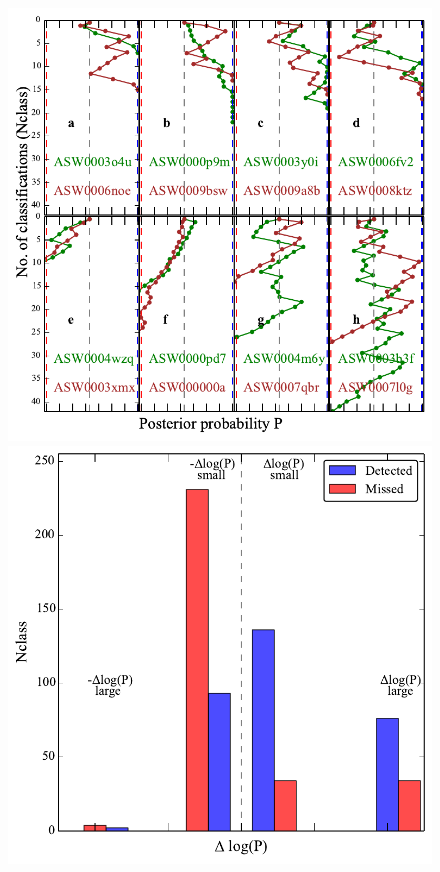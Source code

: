 \documentclass[useAMS,usenatbib,a4paper]{mn2e}
\begin{document}
\begin{figure}
\begin{center}
\includegraphics[scale=0.6]{sw-cfhtls-figs/det_mis_traj.pdf}
\includegraphics[scale=0.6]{sw-cfhtls-figs/det_mis_hist.pdf}

\end{center}
\end{figure}
\end{document}

